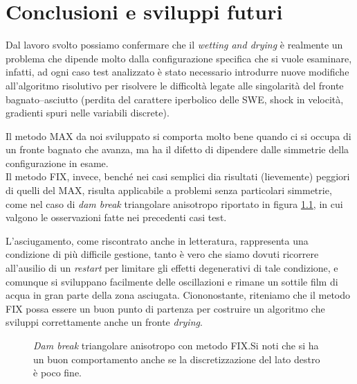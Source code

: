 \documentclass[a4paper,12pt,oneside]{book}
\theoremstyle{definition}
\begin{document}















\chapter{Conclusioni e sviluppi futuri}
Dal lavoro svolto possiamo confermare che il \emph{wetting and drying} \`e realmente un problema che dipende molto dalla configurazione specifica che si vuole esaminare, infatti, ad ogni caso test analizzato \`e stato necessario introdurre nuove modifiche all'algoritmo risolutivo per risolvere le difficolt\`a legate alle singolarit\`a del fronte bagnato--asciutto (perdita del carattere iperbolico delle SWE, shock in velocit\`a, gradienti spuri nelle variabili discrete).

Il metodo MAX da noi sviluppato si comporta molto bene quando ci si occupa di un fronte bagnato che avanza, ma ha il difetto di dipendere dalle simmetrie della configurazione in esame.\\
Il metodo FIX, invece, bench\'e nei casi semplici dia risultati (lievemente) peggiori di quelli del MAX, risulta applicabile a problemi senza particolari simmetrie, come nel caso di \emph{dam break} triangolare anisotropo riportato in figura \ref{fig:triangFIX}, in cui valgono le osservazioni fatte nei precedenti casi test.

L'asciugamento, come riscontrato anche in letteratura, rappresenta una condizione di pi\`u difficile gestione, tanto \`e vero che siamo dovuti ricorrere all'ausilio di un \emph{restart} per limitare gli effetti degenerativi di tale condizione, e comunque si sviluppano facilmente delle oscillazioni e rimane un sottile film di acqua in gran parte della zona asciugata. Ciononostante, riteniamo che il metodo FIX possa essere un buon punto di partenza per costruire un algoritmo che sviluppi correttamente anche un fronte \emph{drying}.\\

\begin{figure}[htbp]
%
%
%
%
%
\caption[\emph{Dam break} triangolare anisotropo con metodo FIX]{\emph{Dam break} triangolare anisotropo con metodo FIX.\quad Si noti che si ha un buon comportamento anche se la discretizzazione del lato destro \`e poco fine.\label{fig:triangFIX}}
\end{figure}
\end{document}
